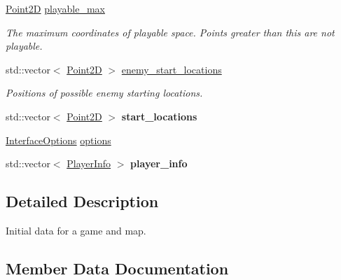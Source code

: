 \begin{DoxyCompactItemize}
\hyperlink{structsc2_1_1_point2_d}{Point2D} \hyperlink{structsc2_1_1_game_info_a5b6d4abc12023b79a197ca3071ee79c8}{playable\+\_\+max}
\begin{DoxyCompactList}\small\item\em The maximum coordinates of playable space. Points greater than this are not playable. \end{DoxyCompactList}\item 
\mbox{\label{structsc2_1_1_game_info_a5b39c34817d8dd67e930d7628d9c32c1}} 
std\+::vector$<$ \hyperlink{structsc2_1_1_point2_d}{Point2D} $>$ \hyperlink{structsc2_1_1_game_info_a5b39c34817d8dd67e930d7628d9c32c1}{enemy\+\_\+start\+\_\+locations}
\begin{DoxyCompactList}\small\item\em Positions of possible enemy starting locations. \end{DoxyCompactList}\item 
\mbox{\label{structsc2_1_1_game_info_ab0ae36af1dd317e1c83e7b5023dc1733}} 
std\+::vector$<$ \hyperlink{structsc2_1_1_point2_d}{Point2D} $>$ {\bfseries start\+\_\+locations}
\item 
\hyperlink{structsc2_1_1_interface_options}{Interface\+Options} \hyperlink{structsc2_1_1_game_info_a44cd71a765e383ef257e75ead9839d1c}{options}
\item 
\mbox{\label{structsc2_1_1_game_info_ae7a02d8615163e50336d511bb9fd300c}} 
std\+::vector$<$ \hyperlink{structsc2_1_1_player_info}{Player\+Info} $>$ {\bfseries player\+\_\+info}
\end{DoxyCompactItemize}


\subsection{Detailed Description}
Initial data for a game and map. 

\subsection{Member Data Documentation}
\mbox{\label{structsc2_1_1_game_info_a44cd71a765e383ef257e75ead9839d1c}} 
